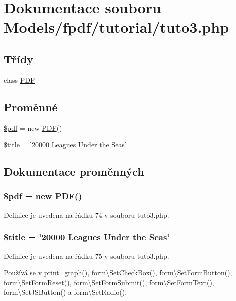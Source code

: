 \hypertarget{tuto3_8php}{\section{Dokumentace souboru Models/fpdf/tutorial/tuto3.php}
\label{tuto3_8php}
}
\subsection*{Třídy}
\begin{DoxyCompactItemize}
\item 
class \hyperlink{class_p_d_f}{P\-D\-F}
\end{DoxyCompactItemize}
\subsection*{Proměnné}
\begin{DoxyCompactItemize}
\item 
\hyperlink{tuto3_8php_a964ee5ee597c515cbb4dad2f14054cb4}{\$pdf} = new \hyperlink{class_p_d_f}{P\-D\-F}()
\item 
\hyperlink{tuto3_8php_ada57e7bb7c152edad18fe2f166188691}{\$title} = '20000 Leagues Under the Seas'
\end{DoxyCompactItemize}


\subsection{Dokumentace proměnných}
\hypertarget{tuto3_8php_a964ee5ee597c515cbb4dad2f14054cb4}{
\subsubsection[{\$pdf}]{\setlength{\rightskip}{0pt plus 5cm}\$pdf = new {\bf P\-D\-F}()}}\label{tuto3_8php_a964ee5ee597c515cbb4dad2f14054cb4}


Definice je uvedena na řádku 74 v souboru tuto3.\-php.

\hypertarget{tuto3_8php_ada57e7bb7c152edad18fe2f166188691}{
\subsubsection[{\$title}]{\setlength{\rightskip}{0pt plus 5cm}\$title = '20000 Leagues Under the Seas'}}\label{tuto3_8php_ada57e7bb7c152edad18fe2f166188691}


Definice je uvedena na řádku 75 v souboru tuto3.\-php.



Používá se v print\-\_\-graph(), form\textbackslash{}\-Set\-Check\-Box(), form\textbackslash{}\-Set\-Form\-Button(), form\textbackslash{}\-Set\-Form\-Reset(), form\textbackslash{}\-Set\-Form\-Submit(), form\textbackslash{}\-Set\-Form\-Text(), form\textbackslash{}\-Set\-J\-S\-Button() a form\textbackslash{}\-Set\-Radio().

